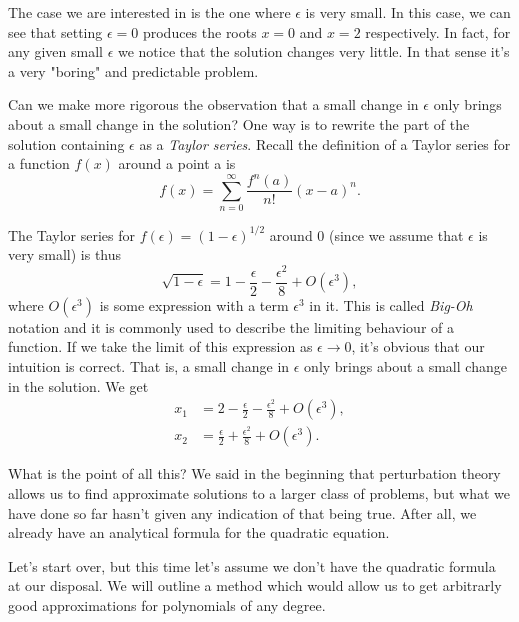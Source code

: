\documentclass[12pt]{article}
\begin{document}
The case we are interested in is the one where $\epsilon$ is very
small. In this case, we can see that setting $\epsilon=0$ produces the
roots $x=0$ and $x=2$ respectively. In fact, for any given small
$\epsilon$ we notice that the solution changes very little. In that
sense it's a very "boring" and predictable problem.

Can we make more rigorous the observation that a small change in
$\epsilon$ only brings about a small change in the solution? One way
is to rewrite the part of the solution containing $\epsilon$ as a
\textit{Taylor series}. Recall the definition of a Taylor series for a
function $f(x)$ around a point a is
\begin{equation}
f(x) = \sum_{n=0}^{\infty} \frac{f^{n}(a)}{n!} (x-a)^n.
\end{equation}

The Taylor series for $f(\epsilon) = (1 - \epsilon)^{1/2}$ around 0
(since we assume that $\epsilon$ is very small) is thus
\begin{equation}
\sqrt{1 - \epsilon} = 1 - \frac{\epsilon}{2} - \frac{\epsilon^2}{8} + O(\epsilon^3),
\end{equation}
where $O(\epsilon^3)$ is some expression with a term $\epsilon^3$ in
it. This is called \textit{Big-Oh} notation and it is commonly used to
describe the limiting behaviour of a function. If we take the limit of
this expression as $\epsilon \to 0$, it's obvious that our intuition
is correct. That is, a small change in $\epsilon$ only brings about a
small change in the solution. We get
\begin{align}
x_1 &= 2 - \frac{\epsilon}{2} - \frac{\epsilon^2}{8} + O(\epsilon^3), \\
x_2 &= \frac{\epsilon}{2} + \frac{\epsilon^2}{8} + O(\epsilon^3).
\end{align}

What is the point of all this? We said in the beginning that
perturbation theory allows us to find approximate solutions to a
larger class of problems, but what we have done so far hasn't given
any indication of that being true. After all, we already have an
analytical formula for the quadratic equation.

Let's start over, but this time let's assume we don't have the
quadratic formula at our disposal. We will outline a method which
would allow us to get arbitrarly good approximations for polynomials
of any degree.
\end{document}

